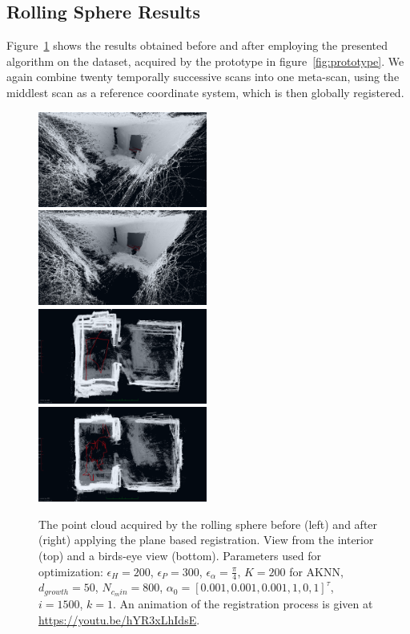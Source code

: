 \subsection{Rolling Sphere Results}

Figure~\ref{fig:jasperhome} shows the results obtained before and after employing the presented algorithm on the dataset, acquired by the prototype in figure~\ref{fig:prototype}.
We again combine twenty temporally successive scans into one meta-scan, using the middlest scan as a reference coordinate system, which is then globally registered.

\begin{figure}
        \centering
        \includegraphics[width=0.495\textwidth]{./images/jasper_uncorr_corner}\hfill
        \includegraphics[width=0.495\textwidth]{./images/jasper_corr_corner}\\
        \includegraphics[width=0.495\textwidth]{./images/jasper_uncorr_top}\hfill
        \includegraphics[width=0.495\textwidth]{./images/jasper_corr_top}
        \caption{The point cloud acquired by the rolling sphere before (left) and after (right) applying the plane based registration. View from the interior (top) and a birds-eye view (bottom). Parameters used for optimization: $\epsilon_H = 200$, $\epsilon_P = 300$, $\epsilon_\alpha = \frac{\pi}{4}$, $K = 200$ for AKNN, $d_{growth} = 50$, $N_{c_min} = 800$, $\alpha_0 = [0.001, 0.001, 0.001, 1, 0, 1]^\tau$, $i = 1500$, $k = 1$. An animation of the registration process is given at \url{https://youtu.be/hYR3xLhIdsE}.}
        \label{fig:jasperhome}
\end{figure}
